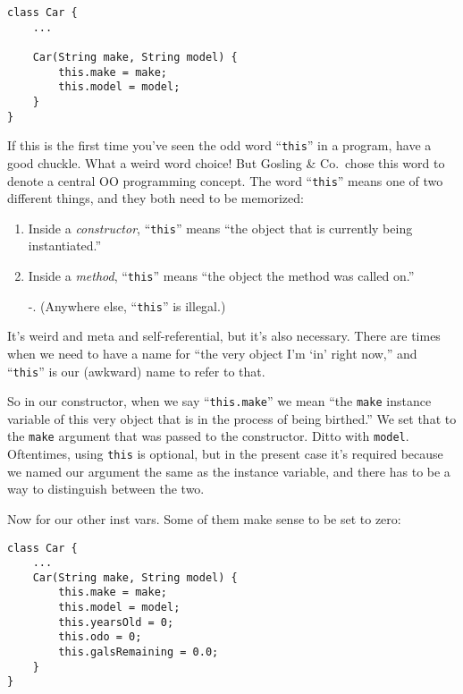 \begin{Verbatim}[samepage=true,fontsize=\footnotesize,frame=single]
class Car {
    ...

    Car(String make, String model) {
        this.make = make;
        this.model = model;
    }
}
\end{Verbatim}
\normalsize

If this is the first time you've seen the odd word ``\texttt{this}'' in a
program, have a good chuckle. What a weird word choice! But Gosling \&
Co.~chose this word to denote a central OO programming concept. The word
``\texttt{this}'' means one of two different things, and they both need to be
memorized:

\begin{enumerate}
\large
\itemsep.1em
\item Inside a \textit{constructor}, ``\texttt{this}'' means ``the object that is
currently being instantiated.''
\item Inside a \textit{method}, ``\texttt{this}'' means ``the object the
method was called on.''
\item[-.] (Anywhere else, ``\texttt{this}'' is illegal.)
\normalsize
\end{enumerate}

It's weird and meta and self-referential, but it's also necessary. There are
times when we need to have a name for ``the very object I'm `in' right now,''
and ``\texttt{this}'' is our (awkward) name to refer to that.

So in our constructor, when we say ``\texttt{this.make}'' we mean ``the
\texttt{make} instance variable of this very object that is in the process of
being birthed.'' We set that to the \texttt{make} argument that was passed to
the constructor. Ditto with \texttt{model}. Oftentimes, using \texttt{this} is
optional, but in the present case it's required because we named our argument
the same as the instance variable, and there has to be a way to distinguish
between the two.

Now for our other inst vars. Some of them make sense to be set to zero:

\begin{Verbatim}[samepage=true,fontsize=\scriptsize,frame=single]
class Car {
    ...
    Car(String make, String model) {
        this.make = make;
        this.model = model;
        this.yearsOld = 0;
        this.odo = 0;
        this.galsRemaining = 0.0;
    }
}
\end{Verbatim}

